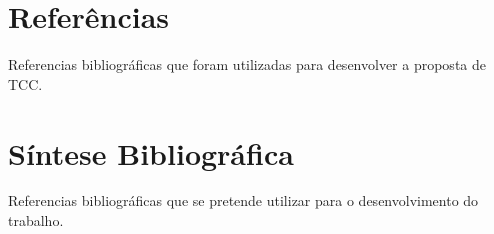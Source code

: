 \documentclass[
    12pt,               %
    a4paper,            %
    english,            %
    brazil,             %
    ]{article}
\begin{document}
\section{Referências}

Referencias bibliográficas que foram utilizadas para desenvolver a proposta de TCC.
    \vspace{-4.3em}
    \renewcommand\refname{}

    

\section{Síntese Bibliográfica}

Referencias bibliográficas que se pretende utilizar para o desenvolvimento do trabalho.


\end{document}
